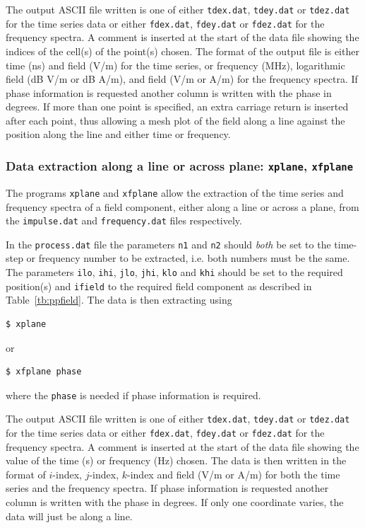 \documentclass[onecolumn,a4paper]{article}
\numberwithin{equation}{section}
\begin{document}
The output ASCII file written is one of either \texttt{tdex.dat}, \texttt{tdey.dat} or \texttt{tdez.dat} for the time series data 
or either \texttt{fdex.dat}, \texttt{fdey.dat} or \texttt{fdez.dat} for the frequency spectra. A comment is inserted at the 
start of the data file showing the indices of the cell(s) of the point(s) chosen. The format of the output file is either time (ns) 
and field (V/m) for the time series, or frequency (MHz), logarithmic field (dB V/m or dB A/m), and field (V/m or A/m) for the frequency spectra.
If phase information is requested another column is written with the phase in degrees.
If more than one point is specified, an extra carriage return is inserted after each point, thus allowing a mesh plot of the field 
along a line against the position along the line and either time or frequency.

\subsubsection{Data extraction along a line or across plane: \texttt{xplane}, \texttt{xfplane}}


The programs \texttt{xplane} and \texttt{xfplane} allow the extraction of the time series and frequency spectra
of a field component, either along a line or across a plane, from the \texttt{impulse.dat} and \texttt{frequency.dat} files respectively.

In the \texttt{process.dat} file the parameters \texttt{n1} and \texttt{n2} should {\em both} be set to the 
time-step or frequency number to be extracted, i.e. both numbers must be the same. 
The parameters \texttt{ilo}, \texttt{ihi}, \texttt{jlo}, \texttt{jhi}, \texttt{klo}
and \texttt{khi} should be set to the required position(s) and \texttt{ifield} to the required field component as described in 
Table~\ref{tb:ppfield}. The data is then extracting using
\begin{verbatim}
$ xplane
\end{verbatim}
or
\begin{verbatim}
$ xfplane phase
\end{verbatim}
where the \texttt{phase} is needed if phase information is required.

The output ASCII file written is one of either \texttt{tdex.dat}, \texttt{tdey.dat} or \texttt{tdez.dat} for the time series data 
or either \texttt{fdex.dat}, \texttt{fdey.dat} or \texttt{fdez.dat} for the frequency spectra. 
A comment is inserted at the start of the data file showing the value 
of the time (s) or frequency (Hz) chosen. The data is then written in the format of $i$-index, $j$-index, 
$k$-index and field (V/m or A/m) for both the time series and the frequency spectra. 
If phase information is requested another column is written with the phase in degrees. If only one coordinate varies, 
the data will just be along a line.
\end{document}

